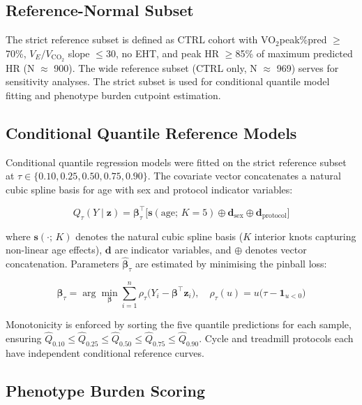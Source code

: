 \documentclass[12pt, a4paper]{article}
\begin{document}
\subsection{Reference-Normal Subset}

The strict reference subset is defined as CTRL cohort with VO$_2$peak\%pred
$\geq$70\%, $V_E/V_{\text{CO}_2}$ slope $\leq$30, no EHT, and peak HR
$\geq$85\% of maximum predicted HR (N $\approx$ 900). The wide reference subset
(CTRL only, N $\approx$ 969) serves for sensitivity analyses. The strict subset
is used for conditional quantile model fitting and phenotype burden cutpoint
estimation.

\subsection{Conditional Quantile Reference Models}

Conditional quantile regression models were fitted on the strict reference
subset at $\tau \in \{0.10, 0.25, 0.50, 0.75, 0.90\}$.
The covariate vector concatenates a natural cubic spline basis for age with
sex and protocol indicator variables:

\begin{equation}
\label{eq:quantile_en}
Q_\tau(Y \mid \mathbf{z}) = \boldsymbol{\beta}_\tau^\top
\bigl[\mathbf{s}(\text{age};\, K{=}5) \oplus \mathbf{d}_{\text{sex}}
\oplus \mathbf{d}_{\text{protocol}}\bigr]
\end{equation}

where $\mathbf{s}(\cdot;\, K)$ denotes the natural cubic spline basis
($K$ interior knots capturing non-linear age effects), $\mathbf{d}$ are
indicator variables, and $\oplus$ denotes vector concatenation.
Parameters $\hat{\boldsymbol{\beta}}_\tau$ are estimated by minimising the
pinball loss:

\begin{equation}
\label{eq:pinball_en}
\hat{\boldsymbol{\beta}}_\tau = \arg\min_{\boldsymbol{\beta}}
\sum_{i=1}^{n} \rho_\tau\bigl(Y_i - \boldsymbol{\beta}^\top \mathbf{z}_i\bigr),
\quad \rho_\tau(u) = u\bigl(\tau - \mathbf{1}_{u < 0}\bigr)
\end{equation}

Monotonicity is enforced by sorting the five quantile predictions for each
sample, ensuring $\hat{Q}_{0.10} \leq \hat{Q}_{0.25} \leq \hat{Q}_{0.50}
\leq \hat{Q}_{0.75} \leq \hat{Q}_{0.90}$. Cycle and treadmill protocols
each have independent conditional reference curves.

\subsection{Phenotype Burden Scoring}
\end{document}
